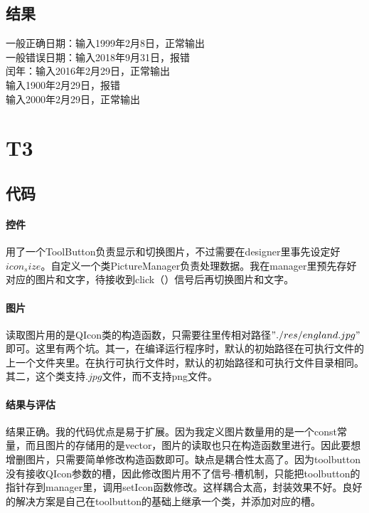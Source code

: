 \documentclass{article}
\begin{document}
\begin{CJK}{UTF8}{gkai}
\subsection{结果}一般正确日期：输入1999年2月8日，正常输出\\
一般错误日期：输入2018年9月31日，报错\\
闰年：输入2016年2月29日，正常输出\\
输入1900年2月29日，报错\\
输入2000年2月29日，正常输出\\
\section{T3}
\subsection{代码} 
\paragraph{控件}用了一个ToolButton负责显示和切换图片，不过需要在designer里事先设定好${icon_size}$。自定义一个类PictureManager负责处理数据。我在manager里预先存好对应的图片和文字，待接收到click（）信号后再切换图片和文字。
\paragraph{图片}读取图片用的是QIcon类的构造函数，只需要往里传相对路径${"./res/england.jpg"}$即可。这里有两个坑。其一，在编译运行程序时，默认的初始路径在可执行文件的上一个文件夹里。在执行可执行文件时，默认的初始路径和可执行文件目录相同。其二，这个类支持${.jpg}$文件，而不支持png文件。
\paragraph{结果与评估}结果正确。我的代码优点是易于扩展。因为我定义图片数量用的是一个const常量，而且图片的存储用的是vector，图片的读取也只在构造函数里进行。因此要想增删图片，只需要简单修改构造函数即可。缺点是耦合性太高了。因为toolbutton没有接收QIcon参数的槽，因此修改图片用不了信号-槽机制，只能把toolbutton的指针存到manager里，调用setIcon函数修改。这样耦合太高，封装效果不好。良好的解决方案是自己在toolbutton的基础上继承一个类，并添加对应的槽。
\end{CJK}
\end{document}
